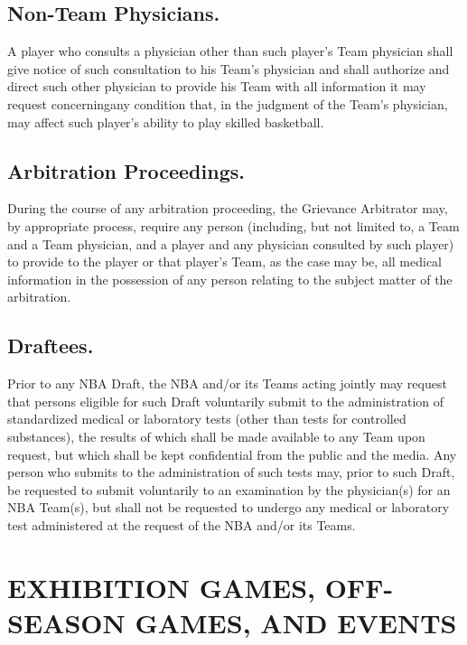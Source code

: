 \documentclass[
]{book}
\begin{document}
\hypertarget{non-team-physicians.}{%
\section{Non-Team Physicians.}\label{non-team-physicians.}}

A player who consults a physician other than such player's Team physician shall give notice of such consultation to his Team's physician and shall authorize and direct such other physician to provide his Team with all information it may request concerningany condition that, in the judgment of the Team's physician, may affect such player's ability to play skilled basketball.

\hypertarget{arbitration-proceedings.}{%
\section{Arbitration Proceedings.}\label{arbitration-proceedings.}}

During the course of any arbitration proceeding, the Grievance Arbitrator may, by appropriate process, require any person (including, but not limited to, a Team and a Team physician, and a player and any physician consulted by such player) to provide to the player or that player's Team, as the case may be, all medical information in the possession of any person relating to the subject matter of the arbitration.

\hypertarget{draftees.}{%
\section{Draftees.}\label{draftees.}}

Prior to any NBA Draft, the NBA and/or its Teams acting jointly may request that persons eligible for such Draft voluntarily submit to the administration of standardized medical or laboratory tests (other than tests for controlled substances), the results of which shall be made available to any Team upon request, but which shall be kept confidential from the public and the media. Any person who submits to the administration of such tests may, prior to such Draft, be requested to submit voluntarily to an examination by the physician(s) for an NBA Team(s), but shall not be requested to undergo any medical or laboratory test administered at the request of the NBA and/or its Teams.

\hypertarget{exhibition-games-off-season-games-and-events}{%
\chapter{EXHIBITION GAMES, OFF-SEASON GAMES, AND EVENTS}\label{exhibition-games-off-season-games-and-events}}
\end{document}
